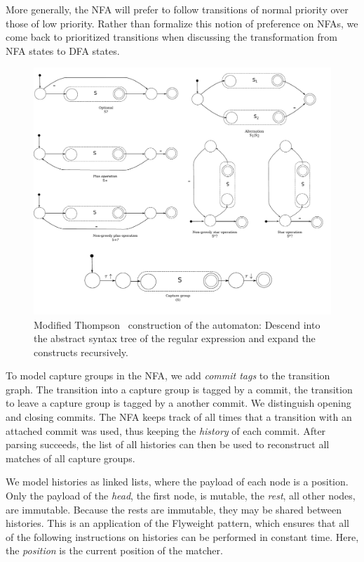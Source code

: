 \documentclass[english,twocolumn]{article}
\theoremstyle{definition}
\begin{document}
More generally, the NFA will prefer to follow transitions of normal
priority over those of low priority. Rather than formalize this
notion of preference on NFAs, we come back to prioritized transitions when
discussing the transformation from NFA states to DFA states.

\begin{figure}[tb] \includegraphics[width=\linewidth]{graphs/thompson}
\caption{Modified Thompson~\cite{Thom68a} construction of the
automaton: Descend into the abstract syntax tree of the regular
expression and expand the constructs recursively.}
\label{fig:thompson-construction} 
\end{figure}

To model capture groups in the NFA, we add \emph{commit tags} to
the transition graph. The transition into a capture group is tagged
by a commit, the transition to leave a capture group is tagged by
a another commit. We distinguish opening and closing commits. The
NFA keeps track of all times that a transition with an attached
commit was used, thus keeping the \emph{history} of each commit.
After parsing succeeds, the list of all histories can then be used
to reconstruct all matches of all capture groups.

We model histories as linked lists, where the payload of each node
is a position.  Only the payload of the \emph{head}, the first node,
is mutable, the \emph{rest}, all other nodes, are immutable.  Because
the rests are immutable, they may be shared between histories.  This
is an application of the Flyweight pattern, which ensures that all
of the following instructions on histories can be performed in
constant time. Here, the \emph{position} is the current position
of the matcher.
\end{document}
